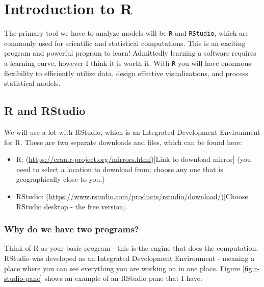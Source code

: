 \documentclass[
]{book}
\providecommand{\tightlist}{%
  \setlength{\itemsep}{0pt}\setlength{\parskip}{0pt}}
\theoremstyle{definition}
\theoremstyle{definition}
\theoremstyle{definition}
\theoremstyle{remark}
\begin{document}
\hypertarget{r-intro-02}{%
\chapter{Introduction to R}\label{r-intro-02}}

The primary tool we have to analyze models will be \texttt{R} and \texttt{RStudio}, which are commonly used for scientific and statistical computations. This is an exciting program and powerful program to learn! Admittedly learning a software requires a learning curve, however I think it is worth it. With \texttt{R} you will have enormous flexibility to efficiently utilize data, design effective visualizations, and process statistical models.

\hypertarget{r-and-rstudio}{%
\section{R and RStudio}\label{r-and-rstudio}}

We will use a lot with RStudio, which is an Integrated Development Environment for R.
These are two separate downloads and files, which can be found here:

\begin{itemize}
\tightlist
\item
  R: (\url{https://cran.r-project.org/mirrors.html}){[}Link to download mirror{]} (you need to select a location to download from; choose any one that is geographically close to you.)
\item
  RStudio: (\url{https://www.rstudio.com/products/rstudio/download/}){[}Choose RStudio desktop - the free version{]}.
\end{itemize}

\hypertarget{why-do-we-have-two-programs}{%
\subsection{Why do we have two programs?}\label{why-do-we-have-two-programs}}

Think of R as your basic program - this is the engine that does the computation. RStudio was developed as an Integrated Development Environment - meaning a place where you can see everything you are working on in one place. Figure \ref{fig:r-studio-pane} shows an example of an RStudio pane that I have:
\end{document}
